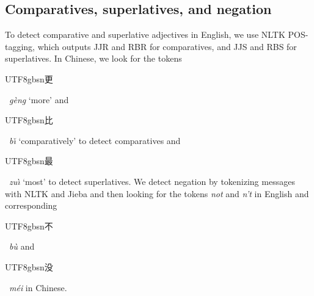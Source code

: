 \documentclass[11pt,a4paper]{article}
\newenvironment{zh}{\begin{CJK}{UTF8}{gbsn}}{\end{CJK}}
\newcommand{\textzh}[2]{\begin{zh}#1\end{zh}~\emph{#2}}
\renewcommand{\|}{\mid}
\begin{document}
\subsection{Comparatives, superlatives, and negation}

To detect comparative and superlative adjectives in English, we use NLTK POS-tagging, which outputs JJR and RBR for comparatives, and JJS and RBS for superlatives. In Chinese, we look for the tokens \textzh{更}{g\`eng} `more' and \textzh{比}{b\v{\i}} `comparatively' to detect comparatives and \textzh{最}{zu\`{\i}} `most' to detect superlatives. We detect negation by tokenizing messages with NLTK and Jieba and then looking for the tokens \emph{not} and \emph{n't} in English and corresponding \textzh{不}{b\`u} 
and \textzh{没}{m\'ei} 
in Chinese.
\end{document}
